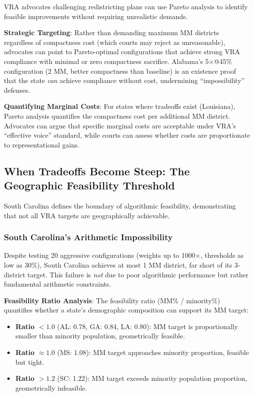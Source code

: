 VRA advocates challenging redistricting plans can use Pareto analysis to identify feasible improvements without requiring unrealistic demands.

\textbf{Strategic Targeting}: Rather than demanding maximum MM districts regardless of compactness cost (which courts may reject as unreasonable), advocates can point to Pareto-optimal configurations that achieve strong VRA compliance with minimal or zero compactness sacrifice. Alabama's 5×@45\% configuration (2 MM, better compactness than baseline) is an existence proof that the state \emph{can} achieve compliance without cost, undermining ``impossibility'' defenses.

\textbf{Quantifying Marginal Costs}: For states where tradeoffs exist (Louisiana), Pareto analysis quantifies the compactness cost per additional MM district. Advocates can argue that specific marginal costs are acceptable under VRA's ``effective voice'' standard, while courts can assess whether costs are proportionate to representational gains.

\subsection{When Tradeoffs Become Steep: The Geographic Feasibility Threshold}

South Carolina defines the boundary of algorithmic feasibility, demonstrating that not all VRA targets are geographically achievable.

\subsubsection{South Carolina's Arithmetic Impossibility}

Despite testing 20 aggressive configurations (weights up to 1000×, thresholds as low as 30\%), South Carolina achieves at most 1 MM district, far short of its 3-district target. This failure is \emph{not} due to poor algorithmic performance but rather fundamental arithmetic constraints.

\textbf{Feasibility Ratio Analysis}: The feasibility ratio (MM\% / minority\%) quantifies whether a state's demographic composition can support its MM target:
\begin{itemize}
    \item \textbf{Ratio $< 1.0$} (AL: 0.78, GA: 0.84, LA: 0.80): MM target is proportionally smaller than minority population, geometrically feasible.
    \item \textbf{Ratio $\approx 1.0$} (MS: 1.08): MM target approaches minority proportion, feasible but tight.
    \item \textbf{Ratio $> 1.2$} (SC: 1.22): MM target exceeds minority population proportion, geometrically infeasible.
\end{itemize}

